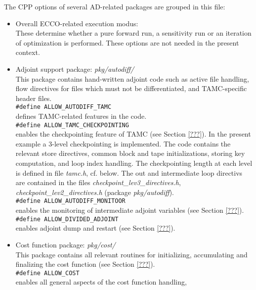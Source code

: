 The CPP options of several AD-related packages are grouped
in this file:
%
\begin{itemize}
%
\item 
Overall ECCO-related execution modus: \\
These determine whether a pure forward run,
a sensitivity run or an iteration of optimization is
performed. These options are not needed in the present context.
%
\item 
Adjoint support package: {\it pkg/autodiff/} \\
This package contains hand-written adjoint code such as
active file handling, flow directives for files which must not
be differentiated, and TAMC-specific header files. \\
%
\hspace*{4ex} {\tt \#define ALLOW\_AUTODIFF\_TAMC} \\
defines TAMC-related features in the code. \\
%
\hspace*{4ex} {\tt \#define ALLOW\_TAMC\_CHECKPOINTING} \\
enables the checkpointing feature of TAMC
(see Section \ref{???}).
In the present example a 3-level checkpointing is implemented.
The code contains the relevant store directives, common block
and tape initializations, storing key computation,
and loop index handling.
The checkpointing length at each level is defined in
file {\it tamc.h}, cf. below.
The out and intermediate loop directivs are contained
in the files {\it checkpoint\_lev3\_directives.h}, 
{\it checkpoint\_lev2\_directives.h} (package {\it pkg/autodiff}). \\
%
\hspace*{4ex} {\tt \#define ALLOW\_AUTODIFF\_MONITOOR} \\
enables the monitoring of intermediate adjoint variables
(see Section \ref{???}). \\
%
\hspace*{4ex} {\tt \#define ALLOW\_DIVIDED\_ADJOINT} \\
enables adjoint dump and restart
(see Section \ref{???}).
%
\item Cost function package: {\it pkg/cost/} \\
This package contains all relevant routines for
initializing, accumulating and finalizing the cost function
(see Section \ref{???}). \\
\hspace*{4ex} {\tt \#define ALLOW\_COST} \\
enables all general aspects of the cost function handling,

\end{itemize}
